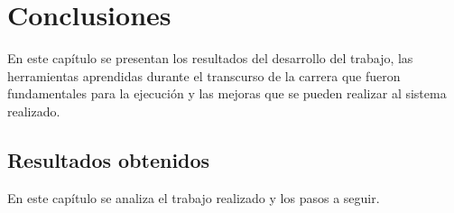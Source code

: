 
\chapter{Conclusiones} %

\label{Chapter5} %

En este capítulo se presentan los resultados del desarrollo del trabajo,  las herramientas aprendidas durante el transcurso de la carrera que fueron fundamentales para la ejecución y las mejoras que se pueden realizar al sistema realizado.



\section{Resultados obtenidos}



En este capítulo se analiza el trabajo realizado y los pasos a seguir.

